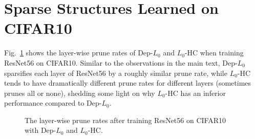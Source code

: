 \documentclass[runningheads, envcountsame, a4paper]{llncs}
\begin{document}
\section{Sparse Structures Learned on CIFAR10}

Fig.~\ref{fig: dist of sparsity2} shows the layer-wise prune rates of Dep-$L_0$ and $L_0$-HC when training ResNet56 on CIFAR10. Similar to the observations in the main text, Dep-$L_0$ sparsifies each layer of ResNet56 by a roughly similar prune rate, while $L_0$-HC tends to have dramatically different prune rates for different layers (sometimes prunes all or none), shedding some light on why $L_0$-HC has an inferior performance compared to Dep-$L_0$. %

\begin{figure}[h]
  \caption{The layer-wise prune rates after training ResNet56 on CIFAR10 with Dep-$L_0$ and $L_0$-HC.}\label{fig: dist of sparsity2}
    \begin{center}
      \hfill
    \end{center}
\end{figure}
\end{document}
